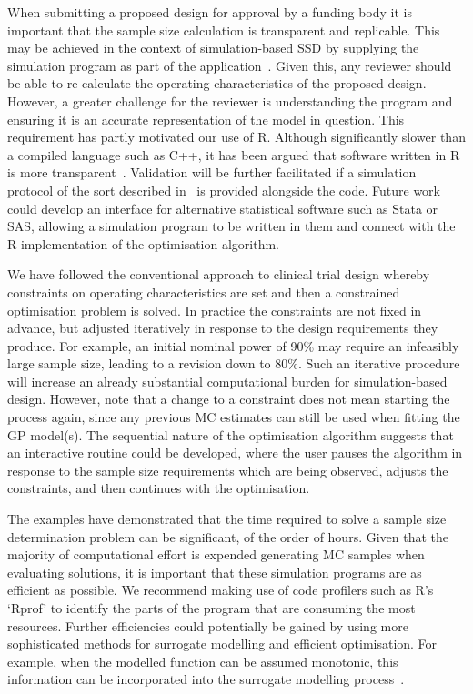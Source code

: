 \documentclass[]{sagej}
\begin{document}
When submitting a proposed design for approval by a funding body it is important that the sample size calculation is transparent and replicable. This may be achieved in the context of simulation-based SSD by supplying the simulation program as part of the application~\cite{Hooper2013}. Given this, any reviewer should be able to re-calculate the operating characteristics of the proposed design. However, a greater challenge for the reviewer is understanding the program and ensuring it is an accurate representation of the model in question. This requirement has partly motivated our use of R. Although significantly slower than a compiled language such as C++, it has been argued that software written in R is more transparent~\cite{Smith2010}. Validation will be further facilitated if a simulation protocol of the sort described in~\cite{Burton2006} is provided alongside the code. Future work could develop an interface for alternative statistical software such as Stata or SAS, allowing a simulation program to be written in them and connect with the R implementation of the optimisation algorithm.

We have followed the conventional approach to clinical trial design whereby constraints on operating characteristics are set and then a constrained optimisation problem is solved. In practice the constraints are not fixed in advance, but adjusted iteratively in response to the design requirements they produce. For example, an initial nominal power of 90\% may require an infeasibly large sample size, leading to a revision down to 80\%. Such an iterative procedure will increase an already substantial computational burden for simulation-based design. However, note that a change to a constraint does not mean starting the process again, since any previous MC estimates can still be used when fitting the GP model(s). The sequential nature of the optimisation algorithm suggests that an interactive routine could be developed, where the user pauses the algorithm in response to the sample size requirements which are being observed, adjusts the constraints, and then continues with the optimisation.

The examples have demonstrated that the time required to solve a sample size determination problem can be significant, of the order of hours. Given that the majority of computational effort is expended generating MC samples when evaluating solutions, it is important that these simulation programs are as efficient as possible. We recommend making use of code profilers such as R's `Rprof' to identify the parts of the program that are consuming the most resources. Further efficiencies could potentially be gained by using more sophisticated methods for surrogate modelling and efficient optimisation. For example, when the modelled function can be assumed monotonic, this information can be incorporated into the surrogate modelling process~\cite{Emmerich2011}.
\end{document}
